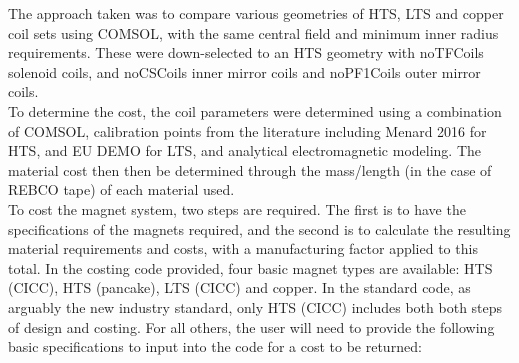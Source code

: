 The approach taken was to compare various geometries of HTS, LTS and copper coil sets using COMSOL, with the same central field and minimum inner radius requirements. These were down-selected to an HTS geometry with noTFCoils solenoid coils, and noCSCoils inner mirror coils and noPF1Coils outer mirror coils.\\

To determine the cost, the coil parameters were determined using a combination of COMSOL, calibration points from the literature including Menard 2016 \cite{Menard2016} for HTS, and EU DEMO for LTS, and analytical electromagnetic modeling. The material cost then then be determined through the mass/length (in the case of REBCO tape) of each material used. \\

To cost the magnet system, two steps are required. The first is to have the specifications of the magnets required, and the second is to calculate the resulting material requirements and costs, with a manufacturing factor applied to this total. In the costing code provided, four basic magnet types are available: HTS (CICC), HTS (pancake), LTS (CICC) and copper. In the standard code, as arguably the new industry standard, only HTS (CICC) includes both both steps of design and costing. For all others, the user will need to provide the following basic specifications to input into the code for a cost to be returned:

